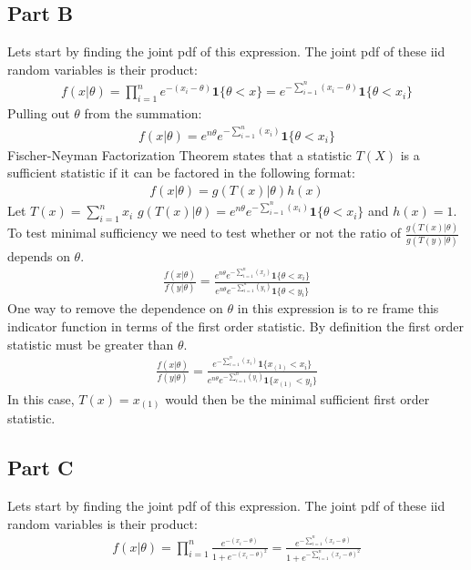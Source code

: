 \documentclass{article}
\begin{document}
\subsection*{Part B}
Lets start by finding the joint pdf of this expression. The joint pdf of these iid random variables is their product:
\begin{align*}
f(x|\theta) = \prod_{i=1}^{n} e^{-(x_i-\theta)} \mathbf{1}\{\theta < x\} = e^{-\sum_{i=1}^{n} (x_i-\theta)} \mathbf{1}\{\theta < x_i\}
\end{align*}
Pulling out $\theta$ from the summation:
\begin{align*}
f(x|\theta) = e^{n\theta} e^{-\sum_{i=1}^{n} (x_i)} \mathbf{1}\{\theta < x_i\}
\end{align*}
Fischer-Neyman Factorization Theorem states that a statistic $T(X)$ is a sufficient statistic if it can be factored in the following format:
\begin{align*}
f(x|\theta) = g(T(x)|\theta)h(x)
\end{align*}
Let $T(x)=\sum_{i=1}^{n} x_i$ $g(T(x)|\theta)= e^{n\theta} e^{-\sum_{i=1}^{n} (x_i)} \mathbf{1}\{\theta < x_i\}$ and $h(x) = 1$. To test minimal sufficiency we need to test whether or not the ratio of $\frac{g(T(x)|\theta)}{g(T(y)|\theta)}$ depends on $\theta$.
\begin{align*}
\frac{f(x|\theta)}{f(y|\theta)} = \frac{e^{n\theta} e^{-\sum_{i=1}^{n} (x_i)} \mathbf{1}\{\theta < x_i\}}{e^{n\theta} e^{-\sum_{i=1}^{n} (y_i)} \mathbf{1}\{\theta < y_i\}}
\end{align*}
One way to remove the dependence on $\theta$ in this expression is to re frame this indicator function in terms of the first order statistic. By definition the first order statistic must be greater than $\theta$.
\begin{align*}
\boxed{ \frac{f(x|\theta)}{f(y|\theta)} = \frac{e^{-\sum_{i=1}^{n} (x_i)} \mathbf{1}\{x_{(1)} < x_i\}}{e^{n\theta} e^{-\sum_{i=1}^{n} (y_i)} \mathbf{1}\{x_{(1)} < y_i\}} }
\end{align*}
In this case, $T(x)=x_{(1)}$ would then be the minimal sufficient first order statistic.

\subsection*{Part C}
Lets start by finding the joint pdf of this expression. The joint pdf of these iid random variables is their product:
\begin{align*}
f(x|\theta) = \prod_{i=1}^{n} \frac{ e^{-(x_i-\theta)} }{1+e^{-(x_i-\theta)^2}} = \frac{ e^{-\sum_{i=1}^{n}(x_i-\theta)} }{1+e^{-\sum_{i=1}^{n}(x_i-\theta)^2}}
\end{align*}
\end{document}
